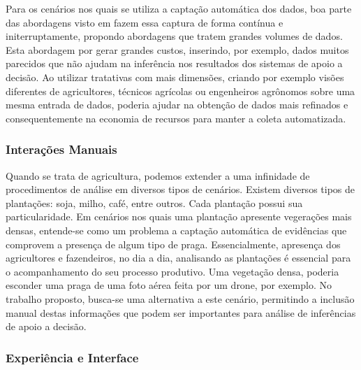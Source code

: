 \documentclass[12pt]{article}
\begin{document}
Para os cenários nos quais se utiliza a captação automática dos dados, boa parte das abordagens visto em \cite{Massruha:2017} fazem essa captura de forma contínua e initerruptamente, propondo abordagens que tratem grandes volumes de dados. Esta abordagem por gerar grandes custos, inserindo, por exemplo, dados muitos parecidos que não ajudam na inferência nos resultados dos sistemas de apoio a decisão. Ao utilizar tratativas com mais dimensões, criando por exemplo visões diferentes de agricultores, técnicos agrícolas ou engenheiros agrônomos sobre uma mesma entrada de dados, poderia ajudar na obtenção de dados mais refinados e consequentemente na economia de recursos para manter a coleta automatizada.

\subsubsection{Interações Manuais}


Quando se trata de agricultura, podemos extender a uma infinidade de procedimentos de análise em diversos tipos de cenários. Existem diversos tipos de plantações: soja, milho, café, entre outros. Cada plantação possui sua particularidade. Em cenários nos quais uma plantação apresente vegerações mais densas, entende-se como um problema a captação automática de evidências que comprovem a presença de algum tipo de praga. Essencialmente, apresença dos agricultores e fazendeiros, no dia a dia, analisando as plantações é essencial para o acompanhamento do seu processo produtivo. Uma vegetação densa, poderia esconder uma praga de uma foto aérea feita por um drone, por exemplo. No trabalho proposto, busca-se uma alternativa a este cenário, permitindo a inclusão manual destas informações que podem ser importantes para análise de inferências de apoio a decisão.



\subsubsection{Experiência e Interface}
\end{document}

